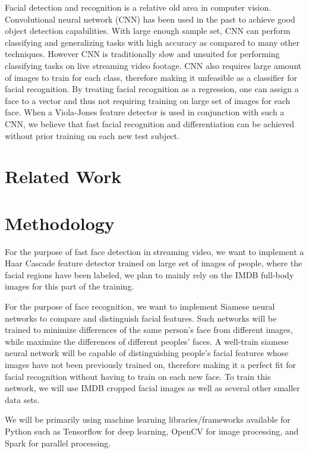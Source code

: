 \documentclass[conference]{IEEEtran}
\begin{document}
Facial detection and recognition is a relative old area in computer vision. Convolutional neural network (CNN) has been used in the past to achieve good object detection capabilities. With large enough sample set, CNN can perform classifying and generalizing tasks with high accuracy as compared to many other techniques. However CNN is traditionally slow and unsuited for performing classifying tasks on live streaming video footage. CNN also requires large amount of images to train for each class, therefore making it unfeasible as a classifier for facial recognition. By treating facial recognition as a regression, one can assign a face to a vector and thus not requiring training on large set of images for each face. When a Viola-Jones feature detector is used in conjunction with such a CNN, we believe that fast facial recognition and differentiation can be achieved without prior training on each new test subject.

\section{Related Work}



\section{Methodology}

For the purpose of fast face detection in streaming video, we want to implement a Haar Cascade feature detector trained on large set of images of people, where the facial regions have been labeled, we plan to mainly rely on the IMDB full-body images for this part of the training.

For the purpose of face recognition, we want to implement Siamese neural networks to compare and distinguish facial features. Such networks will be trained to minimize differences of the same person's face from different images, while maximize the differences of different peoples' faces. A well-train siamese neural network will be capable of distinguishing people's facial features whose images have not been previously trained on, therefore making it a perfect fit for facial recognition without having to train on each new face. To train this network, we will use IMDB cropped facial images as well as several other smaller data sets.

We will be primarily using machine learning libraries/frameworks available for Python such as Tensorflow for deep learning, OpenCV for image processing, and Spark for parallel processing.
\end{document}
